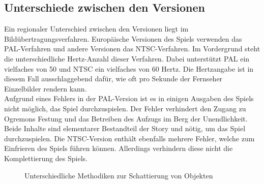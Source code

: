 \subsection{Unterschiede zwischen den Versionen}
Ein regionaler Unterschied zwischen den Versionen liegt im Bildübertragungsverfahren.
Europäische Versionen des Spiels verwenden das \ac{PAL}-Verfahren und andere Versionen das \ac{NTSC}-Verfahren.
Im Vordergrund steht die unterschiedliche Hertz-Anzahl dieser Verfahren.
Dabei unterstützt  \ac{PAL} ein vielfaches von 50 und \ac{NTSC} ein vielfaches von 60 Hertz\cite{pal-vs-ntsc}.
Die Hertzangabe ist in diesem Fall ausschlaggebend dafür, wie oft pro Sekunde der Fernseher Einzelbilder rendern kann.\\

Aufgrund eines Fehlers in der \ac{PAL}-Version ist es in einigen Ausgaben des Spiels nicht möglich, das Spiel durchzuspielen.
Der Fehler verhindert den Zugang zu Ogremons Festung und das Betreiben des Aufzugs im Berg der Unendlichkeit\cite{epicplay}.
Beide Inhalte sind elementarer Bestandteil der Story und nötig, um das Spiel durchzuspielen.
Die \ac{NTSC}-Version enthält ebenfalls mehrere Fehler, welche zum Einfrieren des Spiels führen können\cite{gamefaqglitch}.
Allerdings verhindern diese nicht die Komplettierung des Spiels.\\

\begin{figure}[H]%
    \centering
    \qquad
    \caption{Unterschiedliche Methodiken zur Schattierung von Objekten}%
    \label{fig:dw1-shadow}%
\end{figure}

